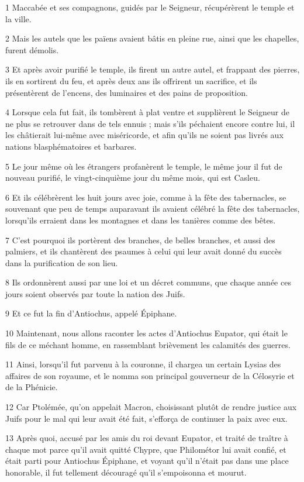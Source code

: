 \par 1 Maccabée et ses compagnons, guidés par le Seigneur, récupérèrent le temple et la ville.
\par 2 Mais les autels que les païens avaient bâtis en pleine rue, ainsi que les chapelles, furent démolis.
\par 3 Et après avoir purifié le temple, ils firent un autre autel, et frappant des pierres, ils en sortirent du feu, et après deux ans ils offrirent un sacrifice, et ils présentèrent de l'encens, des luminaires et des pains de proposition.
\par 4 Lorsque cela fut fait, ils tombèrent à plat ventre et supplièrent le Seigneur de ne plus se retrouver dans de tels ennuis ; mais s'ils péchaient encore contre lui, il les châtierait lui-même avec miséricorde, et afin qu'ils ne soient pas livrés aux nations blasphématoires et barbares.
\par 5 Le jour même où les étrangers profanèrent le temple, le même jour il fut de nouveau purifié, le vingt-cinquième jour du même mois, qui est Casleu.
\par 6 Et ils célébrèrent les huit jours avec joie, comme à la fête des tabernacles, se souvenant que peu de temps auparavant ils avaient célébré la fête des tabernacles, lorsqu'ils erraient dans les montagnes et dans les tanières comme des bêtes.
\par 7 C'est pourquoi ils portèrent des branches, de belles branches, et aussi des palmiers, et ils chantèrent des psaumes à celui qui leur avait donné du succès dans la purification de son lieu.
\par 8 Ils ordonnèrent aussi par une loi et un décret communs, que chaque année ces jours soient observés par toute la nation des Juifs.
\par 9 Et ce fut la fin d'Antiochus, appelé Épiphane.
\par 10 Maintenant, nous allons raconter les actes d'Antiochus Eupator, qui était le fils de ce méchant homme, en rassemblant brièvement les calamités des guerres.
\par 11 Ainsi, lorsqu'il fut parvenu à la couronne, il chargea un certain Lysias des affaires de son royaume, et le nomma son principal gouverneur de la Célosyrie et de la Phénicie.
\par 12 Car Ptolémée, qu'on appelait Macron, choisissant plutôt de rendre justice aux Juifs pour le mal qui leur avait été fait, s'efforça de continuer la paix avec eux.
\par 13 Après quoi, accusé par les amis du roi devant Eupator, et traité de traître à chaque mot parce qu'il avait quitté Chypre, que Philométor lui avait confié, et était parti pour Antiochus Épiphane, et voyant qu'il n'était pas dans une place honorable, il fut tellement découragé qu'il s'empoisonna et mourut.

